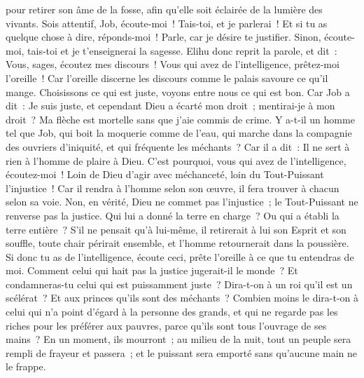 \begin{multicols}{2}
pour retirer son âme de la fosse, afin qu'elle soit éclairée de la lumière des vivants.
Sois attentif, Job, écoute-moi~! Tais-toi, et je parlerai~!
Et si tu as quelque chose à dire, réponds-moi~! Parle, car je désire te justifier.
Sinon, écoute-moi, tais-toi et je t'enseignerai la sagesse.
\VerseOne{}Elihu donc reprit la parole, et dit~:
Vous, sages, écoutez mes discours~! Vous qui avez de l'intelligence, prêtez-moi l'oreille~!
Car l'oreille discerne les discours comme le palais savoure ce qu'il mange.
Choisissons ce qui est juste, voyons entre nous ce qui est bon.
Car Job a dit~: Je suis juste, et cependant Dieu a écarté mon droit~;
mentirai-je à mon droit~? Ma flèche est mortelle sans que j'aie commis de crime.
Y a-t-il un homme tel que Job, qui boit la moquerie comme de l'eau,
qui marche dans la compagnie des ouvriers d'iniquité, et qui fréquente les méchants~? 
Car il a dit~: Il ne sert à rien à l'homme de plaire à Dieu.
 C'est pourquoi, vous qui avez de l'intelligence, écoutez-moi~! Loin de Dieu d'agir avec méchanceté, loin du Tout-Puissant l'injustice~!
Car il rendra à l'homme selon son œuvre, il fera trouver à chacun selon sa voie.
Non, en vérité, Dieu ne commet pas l'injustice~; le Tout-Puissant ne renverse pas la justice.
Qui lui a donné la terre en charge~? Ou qui a établi la terre entière~?
S'il ne pensait qu'à lui-même, il retirerait à lui son Esprit et son souffle,
toute chair périrait ensemble, et l'homme retournerait dans la poussière.
Si donc tu as de l'intelligence, écoute ceci, prête l'oreille à ce que tu entendras de moi.
Comment celui qui hait pas la justice jugerait-il le monde~? Et condamneras-tu celui qui est puissamment juste~?
Dira-t-on à un roi qu'il est un scélérat~? Et aux princes qu'ils sont des méchants~?
Combien moins le dira-t-on à celui qui n'a point d'égard à la personne des grands, et qui ne regarde pas les riches pour les préférer aux pauvres, parce qu'ils sont tous l'ouvrage de ses mains~?
En un moment, ils mourront~; au milieu de la nuit, tout un peuple sera rempli de frayeur et passera~; et le puissant sera emporté sans qu'aucune main ne le frappe.

\end{multicols}
